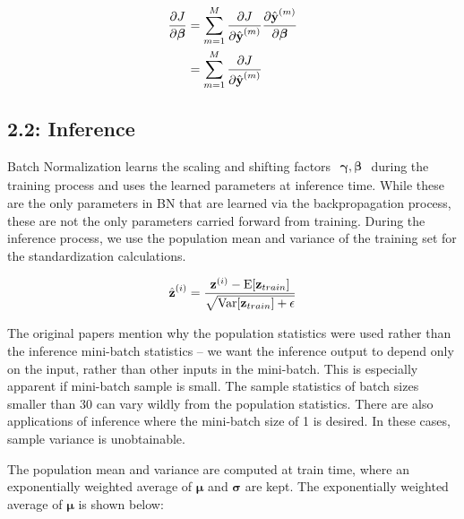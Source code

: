 \documentclass{article}
\begin{document}
\begin{multicols}{2}
\begin{equation}
    \begin{aligned}
        {\partial J \over \partial \boldsymbol{\beta}}
        & =
        \sum_{m=1}^M{\partial J\over \partial \hat{\textbf{y}}^{(m)}} 
        {\partial \hat{\textbf{y}}^{(m)} \over \partial \boldsymbol{\beta}} \\
        & =
        \sum_{m=1}^M{\partial J\over \partial \hat{\textbf{y}}^{(m)}}
    \end{aligned}
\end{equation}









\subsection*{2.2: Inference}

Batch Normalization learns the scaling and shifting factors $\begin{aligned}
    \boldsymbol{\gamma}, \boldsymbol{\beta}
\end{aligned}$ during the training process and uses the learned parameters at inference 
time. While these are the only parameters in BN that are learned via the 
backpropagation process, these are not the only parameters carried forward
from training. During the inference process, we use the population mean 
and variance of the training set for the standardization calculations.

\begin{equation}
    \hat{\textbf{z}}^{(i)} = {\textbf{z}^{(i)} - \text{E}[\textbf{z}_{train}] \over \sqrt{\text{Var}[\textbf{z}_{train}] + \epsilon}}
\end{equation}

The original papers mention why the population statistics were used rather 
than the inference mini-batch statistics -- we want the inference output
to depend only on the input, rather than other inputs in the mini-batch.
This is especially apparent if mini-batch sample is small. The sample statistics
of batch sizes smaller than 30 can vary wildly from the population statistics.
There are also applications of inference where the mini-batch size of 1 is 
desired. In these cases, sample variance is unobtainable.

The population mean and variance are computed at train time, where an 
exponentially weighted average of $\boldsymbol{\mu}$ and $\boldsymbol{\sigma}$
are kept. The exponentially weighted average of $\boldsymbol{\mu}$ is shown below:


\end{multicols}
\end{document}
